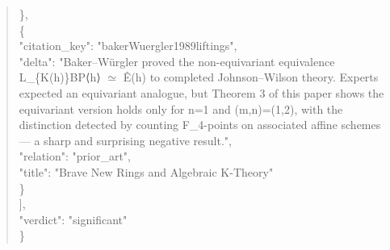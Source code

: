 \documentclass[11pt]{article}
\begin{document}
\begin{quote}
    \},\\
    \{\\
      "citation\_key": "bakerWuergler1989liftings",\\
      "delta": "Baker--Würgler proved the non-equivariant equivalence L\_\{K(h)\}BP⟨h⟩ \ensuremath{\simeq} Ê(h) to completed Johnson--Wilson theory. Experts expected an equivariant analogue, but Theorem 3 of this paper shows the equivariant version holds only for n=1 and (m,n)=(1,2), with the distinction detected by counting F\_4-points on associated affine schemes --- a sharp and surprising negative result.",\\
      "relation": "prior\_art",\\
      "title": "Brave New Rings and Algebraic K-Theory"\\
    \}\\
  ],\\
  "verdict": "significant"\\
\}\\
\end{quote}
\end{document}
